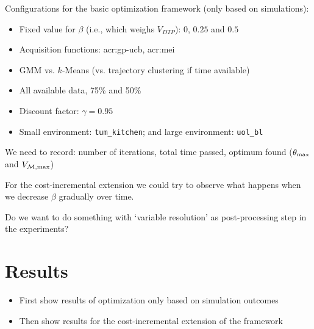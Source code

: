 \noindent Configurations for the basic optimization framework (only based on simulations):
\begin{itemize}
	\item Fixed value for $\beta$ (i.e., which weighs $V_\mathit{DTP}$): $0$, $0.25$ and $0.5$
	\item Acquisition functions: \acrshort{acr:gp-ucb}, \acrshort{acr:mei}
	\item GMM vs. $k$-Means (vs. trajectory clustering if time available)
	\item All available data, 75\% and 50\%
	\item Discount factor: $\gamma = 0.95$
	\item Small environment: \texttt{tum\_kitchen}; and large environment: \texttt{uol\_bl}
\end{itemize}
We need to record: number of iterations, total time passed, optimum found ($\theta_\textnormal{max}$ and $V_{\mathcal{M},\textnormal{max}}$)

\vspace{12pt}
\noindent For the cost-incremental extension we could try to observe what happens when we decrease $\beta$ gradually over time.

\vspace{12pt}
\noindent Do we want to do something with `variable resolution' as post-processing step in the experiments?

\vspace{12pt}
\noindent{}

\section{Results}
\label{sec:results}

\begin{itemize}
	\item First show results of optimization only based on simulation outcomes
	\item Then show results for the cost-incremental extension of the framework
\end{itemize}

